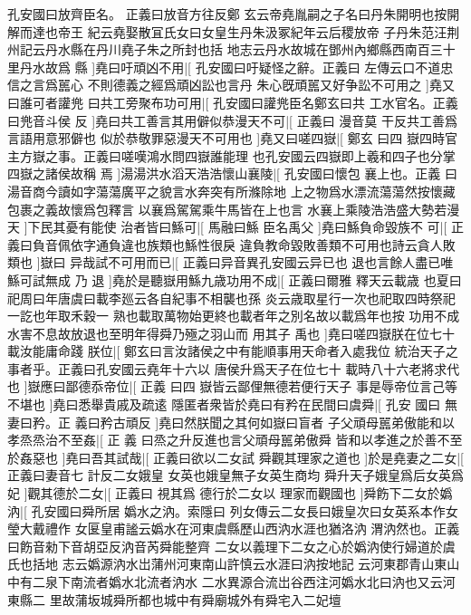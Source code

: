 孔安國曰放齊臣名。%
正義曰放音方往反鄭%
%
玄云帝堯胤嗣之子名曰丹朱開明也按開解而達也帝王%
紀云堯娶散冝氏女曰女皇生丹朱汲冢紀年云后稷放帝%
%
子丹朱范汪荆州記云丹水縣在丹川堯子朱之所封也括%
地志云丹水故城在鄧州內鄉縣西南百三十里丹水故爲%
%
縣%
]堯曰吁頑凶不用|[%
孔安國曰吁疑怪之辭。正義曰%
左傳云口不道忠信之言爲嚚心%
%
不則德義之經爲頑凶訟也言丹%
朱心旣頑嚚又好争訟不可用之%
]堯又曰誰可者讙兠%
%
曰共工旁聚布功可用|[%
孔安國曰讙兠臣名鄭玄曰共%
工水官名。正義曰兠音斗侯%
%
反%
]堯曰共工善言其用僻似恭漫天不可|[%
正義曰%
漫音莫%
%
干反共工善爲言語用意邪僻也%
似於恭敬罪惡漫天不可用也%
]堯又曰嗟四嶽|[%
鄭玄%
曰四%
%
嶽四時官主方嶽之事。正義曰嗟嘆鴻水問四嶽誰能理%
也孔安國云四嶽即上羲和四子也分掌四嶽之諸侯故稱%
%
焉%
]湯湯洪水滔天浩浩懷山襄陵|[%
孔安國曰懷包%
襄上也。正義%
%
曰湯音商今讀如字蕩蕩廣平之貌言水奔突有所滌除地%
上之物爲水漂流蕩蕩然按懷藏包裹之義故懷爲包釋言%
%
以襄爲駕駕乘牛馬皆在上也言%
水襄上乘陵浩浩盛大勢若漫天%
]下民其憂有能使%
%
治者皆曰鯀可|[%
馬融曰鯀%
臣名禹父%
]堯曰鯀負命毀族不%
%
可|[%
正義曰負音佩依字通負違也族類也鯀性很戾%
違負教命毀敗善類不可用也詩云貪人敗類也%
]嶽曰%
%
异哉試不可用而已|[%
正義曰异音異孔安國云异已也%
退也言餘人盡已唯鯀可試無成%
%
乃%
退%
]堯於是聽嶽用鯀九歳功用不成|[%
正義曰爾雅%
釋天云載歳%
%
也夏曰祀周曰年唐虞曰載李廵云各自紀事不相襲也孫%
炎云歳取星行一次也祀取四時祭祀一訖也年取禾穀一%
%
熟也載取萬物始更終也載者年之別名故以載爲年也按%
功用不成水害不息故放退也至明年得舜乃殛之羽山而%
%
用其子%
禹也%
]堯曰嗟四嶽朕在位七十載汝能庸命踐%
%
朕位|[%
鄭玄曰言汝諸侯之中有能順事用天命者入處我位%
統治天子之事者乎。正義曰孔安國云堯年十六以%
%
唐侯升爲天子在位七十%
載時八十六老將求代也%
]嶽應曰鄙德忝帝位|[%
正義%
曰四%
%
嶽皆云鄙俚無德若便行天子%
事是辱帝位言己等不堪也%
]堯曰悉舉貴戚及疏逺%
%
隱匿者衆皆於堯曰有矜在民間曰虞舜|[%
孔安%
國曰%
%
無妻曰矜。正%
義曰矜古頑反%
]堯曰然朕聞之其何如嶽曰盲者%
%
子父頑母嚚弟傲能和以孝烝烝治不至姦|[%
正%
義%
%
曰烝之升反進也言父頑母嚚弟傲舜%
皆和以孝進之於善不至於姦惡也%
]堯曰吾其試哉|[%
%
正義曰欲以二女試%
舜觀其理家之道也%
]於是堯妻之二女|[%
正義曰妻音七%
計反二女娥皇%
%
女英也娥皇無子女英生商均%
舜升天子娥皇爲后女英爲妃%
]觀其德於二女|[%
正義曰%
視其爲%
%
德行於二女以%
理家而觀國也%
]舜飭下二女於嬀汭|[%
孔安國曰舜所居%
嬀水之汭。索隱曰%
%
列女傳云二女長曰娥皇次曰女英系本作女瑩大戴禮作%
女匽皇甫謐云嬀水在河東虞縣歷山西汭水涯也猶洛汭%
%
渭汭然也。正義曰飭音勑下音胡亞反汭音芮舜能整齊%
二女以義理下二女之心於嬀汭使行婦道於虞氏也括地%
%
志云嬀源汭水岀蒲州河東南山許慎云水涯曰汭按地記%
云河東郡青山東山中有二泉下南流者嬀水北流者汭水%
%
二水異源合流岀谷西注河嬀水北曰汭也又云河東縣二%
里故蒲坂城舜所都也城中有舜廟城外有舜宅入二妃壇%
